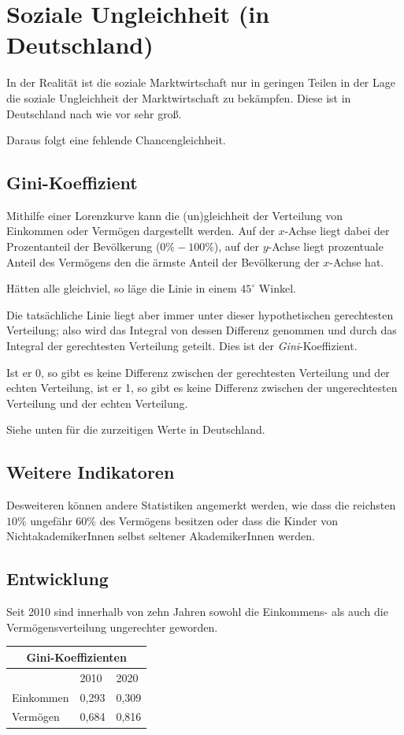 \documentclass{article}
\begin{document}
\section{Soziale Ungleichheit (in Deutschland)}
In der Realität ist die soziale Marktwirtschaft nur in geringen Teilen in der Lage die soziale Ungleichheit der Marktwirtschaft zu bekämpfen. Diese ist in Deutschland nach wie vor sehr groß.
 
Daraus folgt eine fehlende Chancengleichheit. 
 
\subsection{Gini-Koeffizient} 
Mithilfe einer Lorenzkurve kann die (un)gleichheit der Verteilung von Einkommen oder Vermögen dargestellt werden. Auf der $x$-Achse liegt dabei der Prozentanteil der Bevölkerung ($0\% - 100\%$), auf der $y$-Achse liegt prozentuale Anteil des Vermögens den die ärmste Anteil der Bevölkerung der $x$-Achse hat.
  
Hätten alle gleichviel, so läge die Linie in einem $45^\circ$ Winkel.
 
Die tatsächliche Linie liegt aber immer unter dieser hypothetischen gerechtesten Verteilung; also wird das Integral von dessen Differenz genommen und durch das Integral der gerechtesten Verteilung geteilt. Dies ist der \emph{Gini}-Koeffizient.
 
Ist er 0, so gibt es keine Differenz zwischen der gerechtesten Verteilung und der echten Verteilung, ist er 1, so gibt es keine Differenz zwischen der ungerechtesten Verteilung und der echten Verteilung.
 
Siehe unten für die zurzeitigen Werte in Deutschland.
 
\subsection{Weitere Indikatoren}
Desweiteren können andere Statistiken angemerkt werden, wie dass die reichsten $10\%$ ungefähr $60\%$ des Vermögens besitzen oder dass die Kinder von NichtakademikerInnen selbst seltener AkademikerInnen werden.
 
\subsection{Entwicklung}
Seit 2010 sind innerhalb von zehn Jahren sowohl die Einkommens- als auch die Vermögensverteilung ungerechter geworden.
\begin{center}
 \begin{tabular}{lll}
  \multicolumn{3}{c}{Gini-Koeffizienten} \\
  \toprule 
  & 2010 & 2020 \\
  \midrule
  Einkommen & 0,293 & 0,309 \\
  Vermögen  & 0,684 & 0,816 \\
  \bottomrule
 \end{tabular}
\end{center}
 
\end{document}
